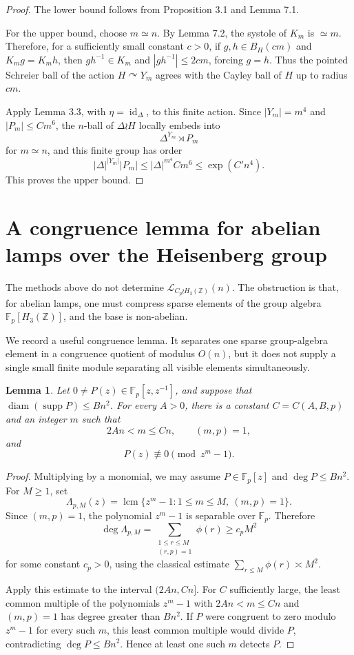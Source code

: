 \documentclass[11pt]{article}
\newcommand{\LEF}{\mathcal L}
\newcommand{\Z}{\mathbb Z}
\newcommand{\F}{\mathbb F}
\newcommand{\supp}{\operatorname{supp}}
\newcommand{\diam}{\operatorname{diam}}
\newcommand{\lcm}{\operatorname{lcm}}
\newtheorem{lemma}[theorem]{Lemma}
\begin{document}
\begin{proof}
The lower bound follows from Proposition 3.1 and Lemma 7.1.

For the upper bound, choose \(m\simeq n\). By Lemma 7.2, the systole of \(K_m\) is \(\simeq m\). Therefore, for a sufficiently small constant \(c>0\), if \(g,h\in B_H(cm)\) and \(K_mg=K_mh\), then \(gh^{-1}\in K_m\) and \(|gh^{-1}|\le 2cm\), forcing \(g=h\). Thus the pointed Schreier ball of the action \(H\curvearrowright Y_m\) agrees with the Cayley ball of \(H\) up to radius \(cm\).

Apply Lemma 3.3, with \(\eta=\operatorname{id}_\Delta\), to this finite action. Since \(|Y_m|=m^4\) and \(|P_m|\le Cm^6\), the \(n\)-ball of \(\Delta\wr H\) locally embeds into
\[
\Delta^{Y_m}\rtimes P_m
\]
for \(m\simeq n\), and this finite group has order
\[
|\Delta|^{|Y_m|}|P_m|\le |\Delta|^{m^4}Cm^6\le \exp(C'n^4).
\]
This proves the upper bound.
\end{proof}

\section{A congruence lemma for abelian lamps over the Heisenberg group}

The methods above do not determine \(\LEF_{C_p\wr H_3(\Z)}(n)\). The obstruction is that, for abelian lamps, one must compress sparse elements of the group algebra \(\F_p[H_3(\Z)]\), and the base is non-abelian.

We record a useful congruence lemma. It separates one sparse group-algebra element in a congruence quotient of modulus \(O(n)\), but it does not supply a single small finite module separating all visible elements simultaneously.

\begin{lemma}
Let \(0\neq P(z)\in\F_p[z,z^{-1}]\), and suppose that \(\diam(\supp P)\le Bn^2\). For every \(A>0\), there is a constant \(C=C(A,B,p)\) and an integer \(m\) such that
\[
2An<m\le Cn,\qquad (m,p)=1,
\]
and
\[
P(z)\not\equiv 0\pmod{z^m-1}.
\]
\end{lemma}

\begin{proof}
Multiplying by a monomial, we may assume \(P\in\F_p[z]\) and \(\deg P\le Bn^2\). For \(M\ge 1\), set
\[
\Lambda_{p,M}(z)=\lcm\{z^m-1:1\le m\le M,\ (m,p)=1\}.
\]
Since \((m,p)=1\), the polynomial \(z^m-1\) is separable over \(\F_p\). Therefore
\[
\deg\Lambda_{p,M}=\sum_{\substack{1\le r\le M\\(r,p)=1}}\phi(r)\ge c_pM^2
\]
for some constant \(c_p>0\), using the classical estimate \(\sum_{r\le M}\phi(r)\asymp M^2\).

Apply this estimate to the interval \((2An,Cn]\). For \(C\) sufficiently large, the least common multiple of the polynomials \(z^m-1\) with \(2An<m\le Cn\) and \((m,p)=1\) has degree greater than \(Bn^2\). If \(P\) were congruent to zero modulo \(z^m-1\) for every such \(m\), this least common multiple would divide \(P\), contradicting \(\deg P\le Bn^2\). Hence at least one such \(m\) detects \(P\).
\end{proof}
\end{document}
